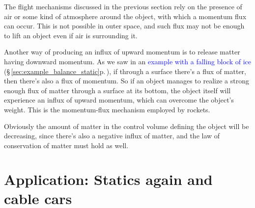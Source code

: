 \documentclass[a4paper,12pt,%
onecolumn,oneside,%
british%
]{memoir}
\renewcommand*{\bm}[1]{\textpdfrender{TextRenderingMode=2,LineWidth=0.2pt}{\boldsymbol{#1}}}
\renewcommand*{\|}[1][]{\nonscript\:#1\vert\nonscript\:\mathopen{}}
\newcommand*{\sect}{\S}%
\renewcommand*{\autoref}[3][\sect\,\ref]{\textcolor{blue}{#3} {\color{blue}\scriptsize(\faIcon[regular]{eye}\;#1{#2}\;p.\,\pageref{#2})}}
\newcommand*{\yvs}{\bm{v}_{\text{s}}}
\newcommand*{\yJ}{J}
\newcommand*{\yrho}{\rho}
\begin{document}
The flight mechanisms discussed in the previous section rely on the presence of air or some kind of atmosphere around the object, with which a momentum flux can occur. This is not possible in outer space, and such flux may not be enough to lift an object even if air is surrounding it.

Another way of producing an influx of upward momentum is to release matter having downward momentum. As we saw in an \autoref{sec:example_balance_static}{example with a falling block of ice}, if through a surface there's a flux of matter, then there's also a flux of momentum. So if an object manages to realize a strong enough flux of matter through a surface at its bottom, the object itself will experience an influx of upward momentum, which can overcome the object's weight. This is the momentum-flux mechanism employed by rockets.

Obviously the amount of matter in the control volume defining the object will be decreasing, since there's also a negative influx of matter, and the law of conservation of matter must hold as well.

%



\section{Application: Statics again and cable cars}
\label{sec:bal_momentum_cablecar}
\end{document}
